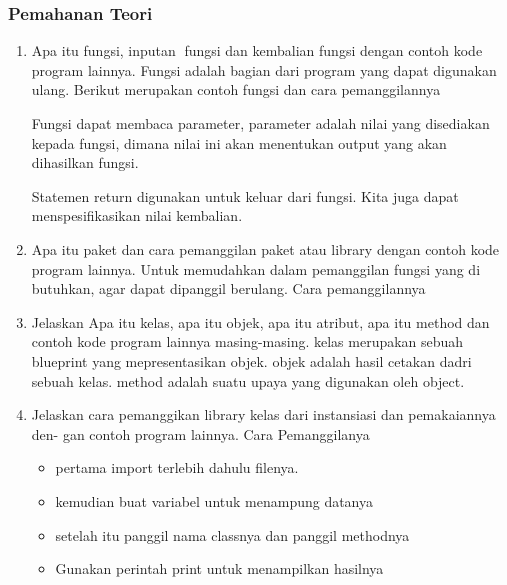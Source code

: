 \subsubsection{Pemahanan Teori}
\begin{enumerate}
    \item Apa itu fungsi, inputan fungsi dan kembalian fungsi dengan contoh kode program
    lainnya.
    Fungsi adalah bagian dari program yang dapat digunakan ulang.
    Berikut merupakan contoh fungsi dan cara pemanggilannya
    

    Fungsi dapat membaca parameter, parameter adalah nilai yang disediakan kepada fungsi, dimana nilai ini akan menentukan output yang akan dihasilkan fungsi.
    

    Statemen return digunakan untuk keluar dari fungsi. Kita juga dapat menspesifikasikan nilai kembalian.
    

    \item Apa itu paket dan cara pemanggilan paket atau library dengan contoh kode
    program lainnya.
    Untuk memudahkan dalam pemanggilan fungsi yang di butuhkan, agar dapat dipanggil berulang.
    Cara pemanggilannya
    

    \item Jelaskan Apa itu kelas, apa itu objek, apa itu atribut, apa itu method dan
    contoh kode program lainnya masing-masing.
    kelas merupakan sebuah blueprint yang mepresentasikan objek.
    objek adalah hasil cetakan dadri sebuah kelas.
    method adalah suatu upaya yang digunakan oleh object.
    

    \item Jelaskan cara pemanggikan library kelas dari instansiasi dan pemakaiannya den-
    gan contoh program lainnya.
    Cara Pemanggilanya 
    \begin{itemize}
        \item pertama import terlebih dahulu filenya.
        \item kemudian buat variabel untuk menampung datanya
        \item setelah itu panggil nama classnya dan panggil methodnya
        \item Gunakan perintah print untuk menampilkan hasilnya


\end{itemize}
\end{enumerate}
